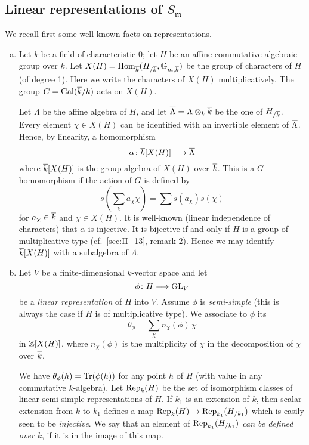 \subsection{Linear representations of \texorpdfstring{$S_{\mathfrak{m}}$}{Sm}}
We recall first some well known facts on representations.

\begin{enumerate}[a)]
\item Let $k$ be a field of characteristic 0; let $H$ be an affine
	\dpage
	commutative algebraic group over $k$. Let $X(H) = \operatorname{Hom}_{\overline{k}}(H_{/\overline{k}}, \mathbb{G}_{m, \overline{k}})$ be the group of characters of $H$
	(of degree 1). Here we write the characters of $X(H)$ multiplicatively.
	The group $G = \operatorname{Gal}(\overline{k}/k)$ acts on $X(H)$.

	Let $\Lambda$ be the affine algebra of $H$, and let $\overline{\Lambda} =
	\Lambda \otimes_k \overline{k}$ be the one of $H_{/\overline{k}}$. Every
	element $\chi \in X(H)$ can be identified with an invertible element of
	$\overline{\Lambda}$. Hence, by linearity, a homomorphism
	\[
		\alpha \colon \overline{k}[X(H)] \longrightarrow \overline{\Lambda}
	\]
	where $\overline{k}[X(H)]$ is the group algebra of $X(H)$ over $\overline{k}$.
	This is a $G$-homomorphism if the action of $G$ is defined by
	\[
		s\left( \sum_{\chi} a_\chi \chi \right) = \sum s(a_\chi) s(\chi)
	\]
	for $a_\chi \in \overline{k}$ and $\chi \in X(H)$. It is well-known (linear
	independence of characters) that $\alpha$ is injective.  It is
	bijective if and only if $H$ is a group of multiplicative type (cf.\ 
	\ref{sec:II_13}, remark 2). Hence we may identify $\overline{k}[X(H)]$ with
	a subalgebra of $\Lambda$.

\item Let $V$ be a finite-dimensional $k$-vector space and let
	\[
		\phi \colon H \longrightarrow \operatorname{GL}_V
	\]
	be a \emph{linear representation} of $H$ into $V$. Assume $\phi$ is
	\emph{semi-simple} (this is always the case if $H$ is of multiplicative
	type). We associate to $\phi$ its \strong{trace}\index{Trace}
	\[
		\theta_\phi = \sum_{\chi} n_\chi(\phi) \, \chi
	\]
	in $\mathbb{Z}[X(H)]$, where $n_\chi(\phi)$ is the multiplicity of $\chi$ in
	the decomposition of $\chi$ over $\overline{k}$.

	We have $\theta_\phi(h) = \operatorname{Tr}(\phi(h))$ for any point $h$ of $H$
	\dpage
	(with value in any commutative $k$-algebra). Let $\operatorname{Rep}_k(H)$ be the set
	of isomorphism classes of linear semi-simple representations of $H$. If
	$k_1$ is an extension of $k$, then scalar extension from $k$ to $k_1$
	defines a map $\operatorname{Rep}_k(H) \to \operatorname{Rep}_{k_1}(H_{/k_1})$ which is easily seen
	to be \emph{injective}. We say that an element of\break
	\emph{$\operatorname{Rep}_{k_1}(H_{/k_1})$ can be defined over $k$}, if it is in the
	image of this map.
\end{enumerate}
